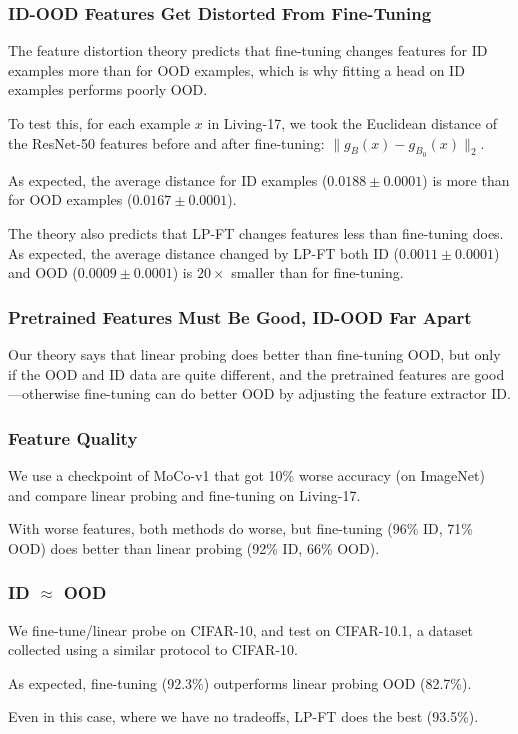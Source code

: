 \documentclass[16pt,aspectratio=169]{beamer}
\begin{document}
\begin{frame}
    \frametitle{ID-OOD Features Get Distorted From Fine-Tuning}

    The feature distortion theory predicts that fine-tuning changes features for ID examples more than for OOD examples, which is why fitting a head on ID examples performs poorly OOD.

    To test this, for each example $x$ in Living-17, we took the Euclidean distance of the ResNet-50 features before and after fine-tuning: $\| g_B(x) - g_{B_0}(x) \|_2$.

    As expected, the average distance for ID examples ($0.0188 \pm 0.0001$) is more than for OOD examples ($0.0167 \pm 0.0001$).

    The theory also predicts that LP-FT changes features less than fine-tuning does. As expected, the average distance changed by LP-FT both ID ($0.0011 \pm 0.0001$) and OOD ($0.0009 \pm 0.0001$) is $20\times$ smaller than for fine-tuning.

\end{frame}

\begin{frame}
    \frametitle{Pretrained Features Must Be Good, ID-OOD Far Apart}

    Our theory says that linear probing does better than fine-tuning OOD, but {\color{magenta} only if the OOD and ID data are quite different, and the pretrained features are good}---otherwise fine-tuning can do better OOD by adjusting the feature extractor ID.

\end{frame}

\begin{frame}
    \frametitle{Feature Quality}

    We use a checkpoint of MoCo-v1 that got 10\% worse accuracy (on ImageNet) and compare linear probing and fine-tuning on Living-17.

    With worse features, both methods do worse, but fine-tuning (96\% ID, 71\% OOD) does better than linear probing (92\% ID, 66\% OOD).

\end{frame}

\begin{frame}
    \frametitle{ID $\approx$ OOD}

    We fine-tune/linear probe on CIFAR-10, and test on CIFAR-10.1, a dataset collected using a similar protocol to CIFAR-10.
    
    As expected, fine-tuning (92.3\%) outperforms linear probing OOD (82.7\%).
    
    Even in this case, where we have no tradeoffs, LP-FT does the best (93.5\%).

\end{frame}
\end{document}
